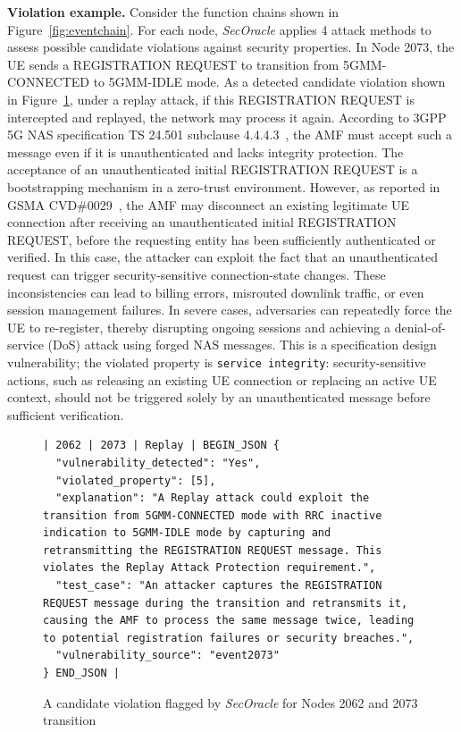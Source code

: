 \noindent \textbf{Violation example.} Consider the function chains shown in Figure~\ref{fig:eventchain}. For each node, \textit{SecOracle} applies 4 attack methods to assess possible candidate violations against security properties. In Node 2073, the UE sends a REGISTRATION REQUEST to transition from 5GMM-CONNECTED to 5GMM-IDLE mode. As a detected candidate violation shown in Figure~\ref{fig:output_secoracle}, under a replay attack, if this REGISTRATION REQUEST is intercepted and replayed, the network may process it again. According to 3GPP 5G NAS specification TS 24.501 subclause 4.4.4.3~\cite{3GPP_TS_24501}, the AMF must accept such a message even if it is unauthenticated and lacks integrity protection. 
The acceptance of an unauthenticated initial REGISTRATION REQUEST is a bootstrapping mechanism in a zero-trust environment. However, as reported in GSMA CVD\#0029~\cite{hussain20195greasoner}, the AMF may disconnect an existing legitimate UE connection after receiving an unauthenticated initial REGISTRATION REQUEST, before the requesting entity has been sufficiently authenticated or verified. In this case, the attacker can exploit the fact that an unauthenticated request can trigger security-sensitive connection-state changes. These inconsistencies can lead to billing errors, misrouted downlink traffic, or even session management failures. In severe cases, adversaries can repeatedly force the UE to re-register, thereby disrupting ongoing sessions and achieving a denial-of-service (DoS) attack using forged NAS messages. This is a specification design vulnerability; the violated property is \texttt{service integrity}: security-sensitive actions, such as releasing an existing UE connection or replacing an active UE context, should not be triggered solely by an unauthenticated message before sufficient verification. 


\begin{figure}[t]
\centering
\begin{minipage}{0.98\columnwidth}
\begin{lstlisting}[style=myjsonblock]
| 2062 | 2073 | Replay | BEGIN_JSON {
  "vulnerability_detected": "Yes",
  "violated_property": [5],
  "explanation": "A Replay attack could exploit the transition from 5GMM-CONNECTED mode with RRC inactive indication to 5GMM-IDLE mode by capturing and retransmitting the REGISTRATION REQUEST message. This violates the Replay Attack Protection requirement.",
  "test_case": "An attacker captures the REGISTRATION REQUEST message during the transition and retransmits it, causing the AMF to process the same message twice, leading to potential registration failures or security breaches.",
  "vulnerability_source": "event2073"
} END_JSON |
\end{lstlisting}
\end{minipage}
\vspace{-0.1in}
\caption{A candidate violation flagged by \textit{SecOracle} for Nodes 2062 and 2073 transition}
\label{fig:output_secoracle}
\vspace{-0.1in}
\end{figure}


